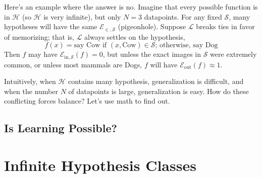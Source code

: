 \documentclass{article}
\newcommand{\Ee}{\mathcal{E}}
\newcommand{\Hh}{\mathcal{H}}
\newcommand{\Ll}{\mathcal{L}}
\newcommand{\Ss}{\mathcal{S}}
\begin{document}
            Here's an example where the answer is no.
                Imagine that every possible function is in $\Hh$ (so $\Hh$ is
                very infinite), but only $N=3$ datapoints.  For any fixed $\Ss$,
                many hypotheses will have the same $\Ee_{\in,\Ss}$
                (pigeonhole).  Suppose $\Ll$ breaks ties in favor of
                memorizing; that is, $\Ll$ always settles on the hypothesis,
                $$
                    f(x) = \text{say Cow if $(x,\text{Cow}) \in \Ss$;
                            otherwise, say Dog}
                $$
                Then $f$ may have $\Ee_{\text{in},\Ss}(f)=0$, but unless the exact 
                images in $\Ss$ were extremely common, or unless most mammals
                are Dogs, $f$ will have $\Ee_{\text{out}}(f)\approx 1$.

            Intuitively, when $\Hh$ contains many hypothesis,
            generalization is difficult, and when the number $N$ of datapoints
            is large, generalization is easy.  How do these conflicting forces
            balance?  Let's use math to find out.

        \subsection{Is Learning Possible?}

    \section{Infinite Hypothesis Classes}
        \subsection{}
        \subsection{}
    
\end{document}
